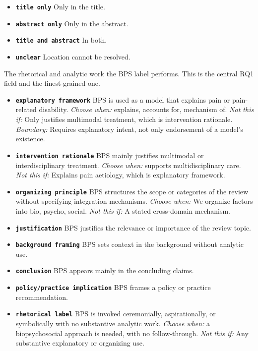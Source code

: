 \documentclass[11pt]{article}
\begin{document}
\begin{description}
  \begin{itemize}[leftmargin=1.3em,itemsep=2pt,topsep=2pt]
  \item \textbf{\texttt{title only}} Only in the title.
  \item \textbf{\texttt{abstract only}} Only in the abstract.
  \item \textbf{\texttt{title and abstract}} In both.
  \item \textbf{\texttt{unclear}} Location cannot be resolved.
  \end{itemize}
\item[\texttt{bps\_function}] The rhetorical and analytic work the BPS label performs. This is the central RQ1 field and the finest-grained one.
  \begin{itemize}[leftmargin=1.3em,itemsep=2pt,topsep=2pt]
  \item \textbf{\texttt{explanatory framework}} BPS is used as a model that explains pain or pain-related disability. {\small \textit{Choose when:} explains, accounts for, mechanism of. \textit{Not this if:} Only justifies multimodal treatment, which is intervention rationale. \textit{Boundary:} Requires explanatory intent, not only endorsement of a model's existence.}
  \item \textbf{\texttt{intervention rationale}} BPS mainly justifies multimodal or interdisciplinary treatment. {\small \textit{Choose when:} supports multidisciplinary care. \textit{Not this if:} Explains pain aetiology, which is explanatory framework.}
  \item \textbf{\texttt{organizing principle}} BPS structures the scope or categories of the review without specifying integration mechanisms. {\small \textit{Choose when:} We organize factors into bio, psycho, social. \textit{Not this if:} A stated cross-domain mechanism.}
  \item \textbf{\texttt{justification}} BPS justifies the relevance or importance of the review topic.
  \item \textbf{\texttt{background framing}} BPS sets context in the background without analytic use.
  \item \textbf{\texttt{conclusion}} BPS appears mainly in the concluding claims.
  \item \textbf{\texttt{policy/practice implication}} BPS frames a policy or practice recommendation.
  \item \textbf{\texttt{rhetorical label}} BPS is invoked ceremonially, aspirationally, or symbolically with no substantive analytic work. {\small \textit{Choose when:} a biopsychosocial approach is needed, with no follow-through. \textit{Not this if:} Any substantive explanatory or organizing use.}

\end{itemize}
\end{description}
\end{document}
